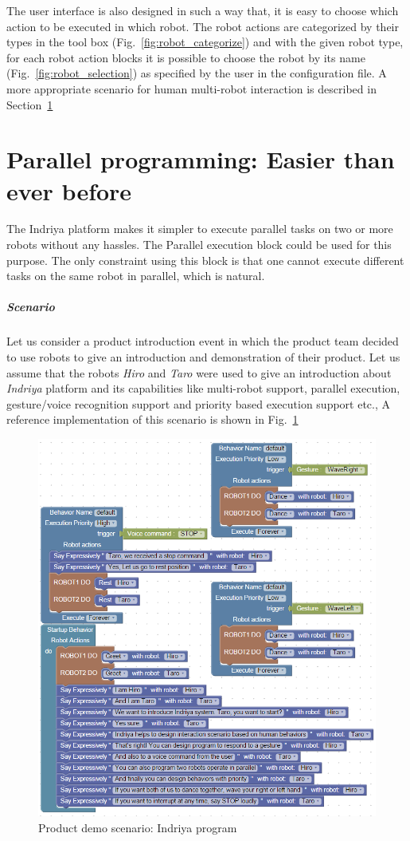 The user interface is also designed in such a way that, it is easy to choose which action to be executed in which robot. The robot actions are categorized by their types in the tool box (Fig.~\ref{fig:robot_categorize}) and with the given robot type, for each robot action blocks it is possible to choose the robot by its name (Fig.~\ref{fig:robot_selection}) as specified by the user in the configuration file.
A more appropriate scenario for human multi-robot interaction is described in Section~\ref{sec:parallel_programming}

\section{Parallel programming: Easier than ever before}
\label{sec:parallel_programming}
The Indriya platform makes it simpler to execute parallel tasks on two or more robots without any hassles. The Parallel execution block could be used for this purpose. The only constraint using this block is that one cannot execute different tasks on the same robot in parallel, which is natural. 
\subparagraph{Scenario}Let us consider a product introduction event in which the product team decided to use robots to give an introduction and demonstration of their product. Let us assume that the robots \emph{Hiro} and \emph{Taro} were used to give an introduction about \emph{Indriya} platform and its capabilities like multi-robot support, parallel execution, gesture/voice recognition support and priority based execution support etc., 
A reference implementation of this scenario is shown in Fig.~\ref{fig:complex_parallel_program}
\begin{figure}[H]
\centering
\includegraphics[width=\textwidth]{../thesis/assets/complex_parallel_scenario.png}
\caption[Product demo scenario: Indriya program]{Product demo scenario: Indriya program}
\label{fig:complex_parallel_program}
\end{figure}
